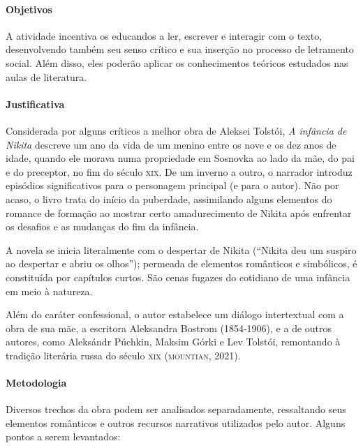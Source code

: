 \documentclass[11pt]{extarticle}
\begin{document}
\paragraph{Objetivos}
A atividade incentiva os educandos a ler, escrever e interagir com o
texto, desenvolvendo também seu senso crítico e sua inserção no processo
de letramento social. Além disso, eles poderão aplicar os conhecimentos
teóricos estudados nas aulas de literatura.

\paragraph{Justificativa}
Considerada por alguns críticos a melhor obra de Aleksei Tolstói,
\emph{A infância de Nikita} descreve um ano da vida de um menino entre
os nove e os dez anos de idade, quando ele morava numa propriedade em
Sosnovka ao lado da mãe, do pai e do preceptor, no fim do século \textsc{xix}. De
um inverno a outro, o narrador introduz episódios significativos para o
personagem principal (e para o autor). Não por acaso, o livro trata do
início da puberdade, assimilando alguns elementos do romance de formação
ao mostrar certo amadurecimento de Nikita após enfrentar os desafios e
as mudanças do fim da infância.

A novela se inicia literalmente com o despertar de Nikita (``Nikita deu
um suspiro ao despertar e abriu os olhos''); permeada de elementos
românticos e simbólicos, é constituída por capítulos curtos. São cenas
fugazes do cotidiano de uma infância em meio à natureza.

Além do caráter confessional, o autor estabelece um diálogo intertextual
com a obra de sua mãe, a escritora Aleksandra Bostrom (1854-1906), e a
de outros autores, como Aleksándr Púchkin, Maksim Górki e Lev Tolstói,
remontando à tradição literária russa do século \textsc{xix} (\textsc{mountian}, 2021).

\paragraph{Metodologia}
Diversos trechos da obra podem ser analisados separadamente, ressaltando
seus elementos românticos e outros recursos narrativos utilizados pelo
autor. Alguns pontos a serem levantados:
\end{document}
